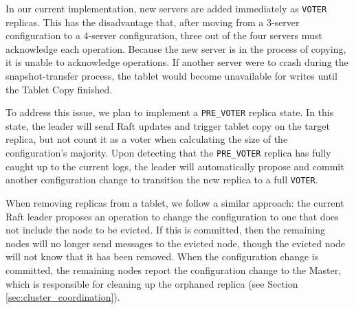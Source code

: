 \documentclass[twocolumn,9pt]{article}
\begin{document}
In our current implementation, new servers are added immediately as {\tt VOTER} replicas.  This has
the disadvantage that, after moving from a 3-server configuration to a 4-server configuration, three
out of the four servers must acknowledge each operation. Because the new server is in the process of
copying, it is unable to acknowledge operations. If another server were to crash during the
snapshot-transfer process, the tablet would become unavailable for writes until the Tablet Copy
finished.

To address this issue, we plan to implement a {\tt PRE\_VOTER} replica state. In this
state, the leader will send Raft updates and trigger tablet copy on the
target replica, but not count it as a voter when calculating the size of the configuration's
majority. Upon detecting that the {\tt PRE\_VOTER} replica has fully caught up to
the current logs, the leader will automatically propose and commit another configuration change to
transition the new replica to a full {\tt VOTER}.

When removing replicas from a tablet, we follow a similar approach: the current Raft leader
proposes an operation to change the configuration to one that does not include the node
to be evicted. If this is committed, then the remaining nodes will no longer send messages
to the evicted node, though the evicted node will not know that it has been removed. When the
configuration change is committed, the remaining nodes report the configuration
change to the Master, which is responsible for cleaning up the orphaned replica (see
Section \ref{sec:cluster_coordination}).
\end{document}
